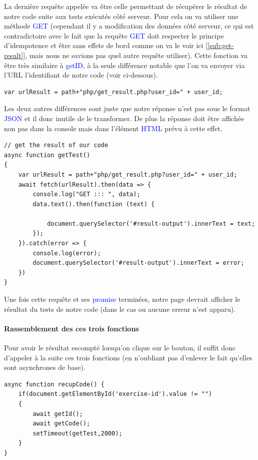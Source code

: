 \documentclass[a4paper]{article}
\renewcommand{\texttt}[2][blue]{\textcolor{#1}{\ttfamily #2}}
\begin{document}
La dernière requête appelée va être celle permettant de récupérer le résultat
de notre code suite aux tests exécutés côté serveur. Pour cela on va utiliser
une méthode \texttt{GET} (cependant il y a modification des données côté
serveur, ce qui est contradictoire avec le fait que la requête \texttt{GET}
doit respecter le principe d'idempotence et être sans effets de bord comme on va
le voir ici [\ref{sub:get-result}], mais nous ne savions pas quel autre requête
utiliser). Cette fonction va être très similaire à \texttt{getID}, à la seule
différence notable que l'on va envoyer via l'URL l'identifiant de notre code
(voir ci-dessous).

\begin{lstlisting}[language=JS]
 var urlResult = path+"php/get_result.php?user_id=" + user_id;
\end{lstlisting}

Les deux autres différences sont juste que notre réponse n'est pas sous le
format \texttt{JSON} et il donc inutile de le transformer. De plus la réponse
doit être affichée non pas dans la console mais dans l'élément \texttt{HTML}
prévu à cette effet.


\begin{lstlisting}[language=JS]
// get the result of our code
async function getTest()
{
    var urlResult = path+"php/get_result.php?user_id=" + user_id;
    await fetch(urlResult).then(data => {
        console.log("GET ::: ", data);
        data.text().then(function (text) {

            document.querySelector('#result-output').innerText = text;
        });
    }).catch(error => {
        console.log(error);
        document.querySelector('#result-output').innerText = error;
    })
}
\end{lstlisting}

Une fois cette requête et ses \texttt{promise} terminées, notre page devrait
afficher le résultat du tests de notre code (dans le cas ou aucune erreur n'est
apparu).

\paragraph{Rassemblement des ces trois fonctions}

Pour avoir le résultat escompté lorsqu'on clique sur le bouton, il suffit donc
d'appeler à la suite ces trois fonctions (en n'oubliant pas d'enlever le fait
qu'elles sont asynchrones de base).

\begin{lstlisting}[language=JS]
async function recupCode() {
    if(document.getElementById('exercise-id').value != "")
    {
        await getId();
        await getCode();
        setTimeout(getTest,2000);
    }
}
\end{lstlisting}
\end{document}

